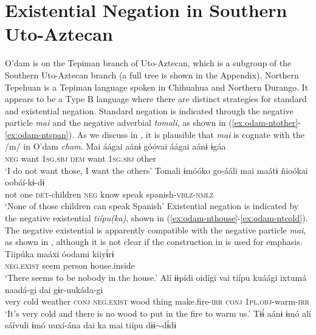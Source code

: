 \documentclass[output=paper]{langsci/langscibook}
\begin{document}
\section{Existential Negation in Southern Uto-Aztecan}
\label{sec:odam-exnegsouth}
O’dam is on the Tepiman branch of Uto-Aztecan, which is a subgroup of the
Southern Uto-Aztecan branch (a full tree is shown in the Appendix).
Northern Tepehuan is a Tepiman language spoken in Chihuahua and Northern
Durango. It appears to be a Type B language where there are distinct
strategies for standard and existential negation. Standard negation is
indicated through the negative particle \emph{mai} and the negative
adverbial \emph{tomali}, as shown in (\ref{ex:odam-ntother}-\ref{ex:odam-ntspan}). As we
discuss in , it is plausible that \emph{mai} is cognate with the /m/ in O'dam \emph{cham}.
\ea
\label{ex:odam-ntother}
\gll Mai 	áágai 	aánɨ 		góóvai	áágai	aánɨ 		ɨgáa\\
\textsc{neg} 	want	\textsc{1sg.sbj} 	\textsc{dem}	want 	\textsc{1sg.sbj}	other\\
\glt ‘I do not want those, I want the others’ \citep[26]{bascom2003}
\z 
\ea
\label{ex:odam-ntspan}
\gll Tomali 	ɨmóóko 	go-ááli 	mai 	maátɨ 	ñioókai	oobáí-kɨ-dɨ\\
not		one		\textsc{det}-children	\textsc{neg}	know	speak		spanish-\textsc{vblz-nmlz}\\
\glt ‘None of those children can speak Spanish’ \citep[32]{bascom2003}
\z 
Existential negation is indicated by the negative existential \emph{tiípu(ka)}, shown in (\ref{ex:odam-nthouse}-\ref{ex:odam-ntcold}). The negative existential is apparently compatible with the negative particle \emph{mai}, as shown in , although it is not clear if the construction in  is used for emphasis.
\ea
\label{ex:odam-nthouse}
\gll Tiipúka 	maáxi 	óodami 	kiiyɨ́rɨ\\
\textsc{neg.exist}	seem	person		house.inside\\
\glt ‘There seems to be nobody in the house.’ \citep[264]{bascomm1998}
\z 
\ea
\label{ex:odam-ntcold}
\gll Alí 	ɨɨpídi	oidígi 		vai 	tiípu 		kuáági	ixtumá		naadá-gi dai 	gɨr-uukáda-gi\\
	very	cold	weather	\textsc{conj}	\textsc{neg.exist}	wood	thing		make.fire-\textsc{irr} \textsc{conj}	\textsc{1pl.obj}-warm-\textsc{irr}\\
\glt ‘It’s very cold and there is no wood to put in the fire to warm us.’ \citep[264]{bascomm1998}
\z 
\ea
\label{ex:odam-hive}
\gll Tɨɨ́ 	aánɨ 		ɨmó	alí 	sáívuli 	ɨmó 	uuxí-ána 	dai ka 		mai	tiípu 		dɨɨ$\sim$dɨ́dɨ \\
\end{document}
